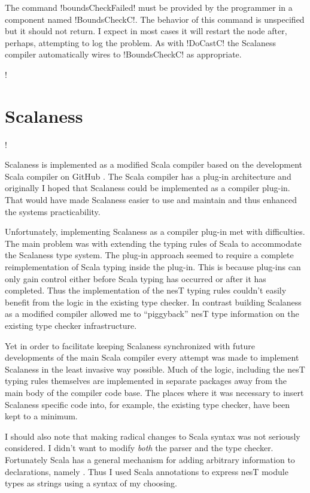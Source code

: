 The command !boundsCheckFailed! must be provided by the programmer in a component named
!BoundsCheckC!. The behavior of this command is unspecified but it should not return. I expect
in most cases it will restart the node after, perhaps, attempting to log the problem. As with
!DoCastC! the Scalaness compiler automatically wires to !BoundsCheckC! as appropriate.

\lstDeleteShortInline!

\section{Scalaness}
\label{section-scalaness-implementation}

\lstset{language=scalaness}
\lstMakeShortInline!

Scalaness is implemented as a modified Scala compiler based on the development Scala compiler on
GitHub \cite{scalaness-home}. The Scala compiler has a plug-in architecture and originally I
hoped that Scalaness could be implemented as a compiler plug-in. That would have made Scalaness
easier to use and maintain and thus enhanced the systems practicability.

Unfortunately, implementing Scalaness as a compiler plug-in met with difficulties. The main
problem was with extending the typing rules of Scala to accommodate the Scalaness type system.
The plug-in approach seemed to require a complete reimplementation of Scala typing inside the
plug-in. This is because plug-ins can only gain control either before Scala typing has occurred
or after it has completed. Thus the implementation of the nesT typing rules couldn't easily
benefit from the logic in the existing type checker. In contrast building Scalaness as a
modified compiler allowed me to ``piggyback'' nesT type information on the existing type checker
infrastructure.

Yet in order to facilitate keeping Scalaness synchronized with future developments of the main
Scala compiler every attempt was made to implement Scalaness in the least invasive way possible.
Much of the logic, including the nesT typing rules themselves are implemented in separate
packages away from the main body of the compiler code base. The places where it was necessary to
insert Scalaness specific code into, for example, the existing type checker, have been kept to a
minimum.

I should also note that making radical changes to Scala syntax was not seriously considered. I
didn't want to modify \emph{both} the parser and the type checker. Fortunately Scala has a
general mechanism for adding arbitrary information to declarations, namely
. Thus I used Scala annotations to express nesT module types as strings
using a syntax of my choosing.


